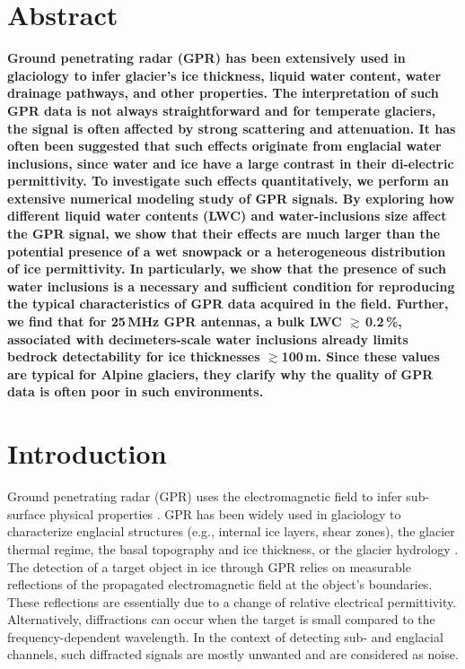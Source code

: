 
\section{Abstract}

\textbf{Ground penetrating radar (GPR) has been extensively used in glaciology to infer glacier's ice thickness, liquid water content, water drainage pathways, and other properties. The interpretation of such GPR data is not always straightforward and for temperate glaciers, the signal is often affected by strong scattering and attenuation. It has often been suggested that such effects originate from englacial water inclusions, since water and ice  have a large contrast in their di-electric permittivity. To investigate such effects quantitatively, we perform an extensive numerical modeling study of GPR signals. By exploring how different liquid water contents (LWC) and water-inclusions size affect the GPR signal, we show that their effects are much larger than the potential presence of a wet snowpack or a heterogeneous distribution of ice permittivity. In particularly, we show that the presence of such water inclusions is a necessary and sufficient condition for reproducing the typical characteristics of GPR data acquired in the field. Further, we find that for 25\,MHz GPR antennas, a bulk LWC $\gtrsim $\,0.2\,\%, associated with decimeters-scale water inclusions already limits bedrock detectability for ice thicknesses $\gtrsim$100\,m. Since these values are typical for Alpine glaciers, they clarify why the quality of GPR data is often poor in such environments.}


\section{Introduction} 

Ground penetrating radar (GPR) uses the electromagnetic field to infer sub-surface physical properties \citep{Davis&Annan1989}. GPR has been widely used in glaciology to characterize englacial structures (e.g., internal ice layers, shear zones), the glacier thermal regime, the basal topography and ice thickness, or the glacier hydrology \citep[see][for reviews]{Woodward&Burke2007,Plewes&Hubbard2001,Navarro&Eisen2009,Schroeder&al2020}. The detection of a target object in ice through GPR relies on measurable reflections of the propagated electromagnetic field at the object's boundaries. These reflections are essentially due to a change of relative electrical permittivity. Alternatively, diffractions can occur when the target is small compared to the frequency-dependent wavelength. In the context of detecting sub- and englacial channels, such diffracted signals are mostly unwanted and are considered as noise. 

